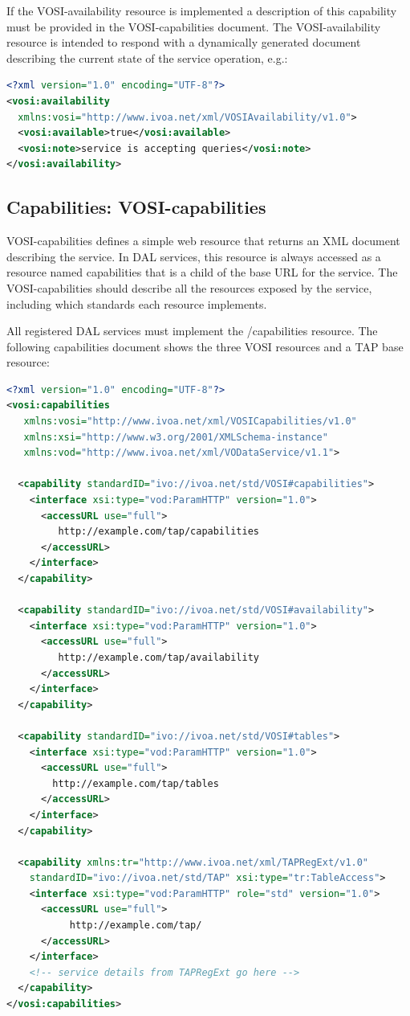\documentclass[11pt,letter]{ivoa}
\begin{document}
If the VOSI-availability resource is implemented a description
of this capability must be provided in the VOSI-capabilities document.
The VOSI-availability resource is
intended to respond with a dynamically generated document describing the current state of the service
operation, e.g.:

\begin{lstlisting}[language=XML,basicstyle=\footnotesize]
<?xml version="1.0" encoding="UTF-8"?>
<vosi:availability
  xmlns:vosi="http://www.ivoa.net/xml/VOSIAvailability/v1.0">
  <vosi:available>true</vosi:available>
  <vosi:note>service is accepting queries</vosi:note>
</vosi:availability>
\end{lstlisting}

\subsection{Capabilities: VOSI-capabilities}
\label{sec:vosi-capabilities}
VOSI-capabilities \citep{2017ivoa.spec.0524G} defines a simple web resource that
returns an XML document
describing the service. In  DAL services, this resource is always accessed as a
resource named capabilities that is a child of the base URL for the service. The
VOSI-capabilities should describe all the resources exposed by the service,
including which standards each resource implements.

All registered DAL services must implement the /capabilities resource. The following
capabilities document shows the three VOSI resources and a TAP base resource:

\begin{lstlisting}[language=XML,basicstyle=\footnotesize]
<?xml version="1.0" encoding="UTF-8"?>
<vosi:capabilities
   xmlns:vosi="http://www.ivoa.net/xml/VOSICapabilities/v1.0"
   xmlns:xsi="http://www.w3.org/2001/XMLSchema-instance"
   xmlns:vod="http://www.ivoa.net/xml/VODataService/v1.1">

  <capability standardID="ivo://ivoa.net/std/VOSI#capabilities">
    <interface xsi:type="vod:ParamHTTP" version="1.0">
      <accessURL use="full">
         http://example.com/tap/capabilities
      </accessURL>
    </interface>
  </capability>

  <capability standardID="ivo://ivoa.net/std/VOSI#availability">
    <interface xsi:type="vod:ParamHTTP" version="1.0">
      <accessURL use="full">
         http://example.com/tap/availability
      </accessURL>
    </interface>
  </capability>

  <capability standardID="ivo://ivoa.net/std/VOSI#tables">
    <interface xsi:type="vod:ParamHTTP" version="1.0">
      <accessURL use="full">
        http://example.com/tap/tables
      </accessURL>
    </interface>
  </capability>

  <capability xmlns:tr="http://www.ivoa.net/xml/TAPRegExt/v1.0"
    standardID="ivo://ivoa.net/std/TAP" xsi:type="tr:TableAccess">
    <interface xsi:type="vod:ParamHTTP" role="std" version="1.0">
      <accessURL use="full">
           http://example.com/tap/
      </accessURL>
    </interface>
    <!-- service details from TAPRegExt go here -->
  </capability>
</vosi:capabilities>
\end{lstlisting}
\end{document}
